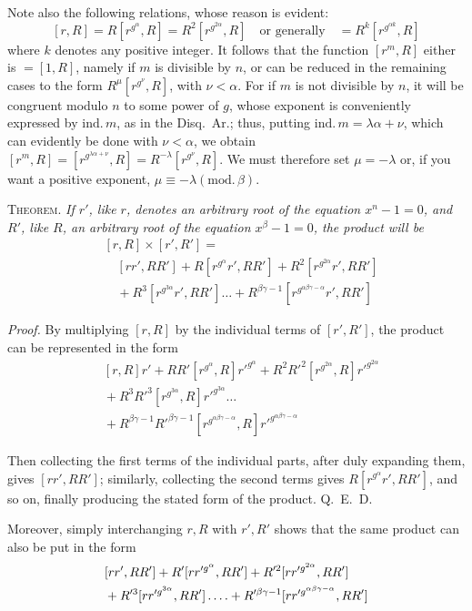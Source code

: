 Note also the following relations, whose reason is evident:
\[
[r,R]=R[r^{g^\alpha},R]=R^2[r^{g^{2\alpha}},R]\quad\text{or generally}\quad=R^k[r^{g^{\alpha k}},R]
\]
where $k$ denotes any positive integer. It follows that the function $[r^m,R]$ either is $=[1,R]$, namely if $m$ is divisible by $n$, or can be reduced in the remaining cases to the form $R^\mu[r^{g^\nu},R]$, with $\nu<\alpha$. For if $m$ is not divisible by $n$, it will be congruent modulo $n$ to some power of $g$, whose exponent is conveniently expressed by $\mathrm{ind.}\,m$, as in the Disq.\ Ar.; thus, putting $\mathrm{ind.}\,m=\lambda\alpha+\nu$, which can evidently be done with $\nu<\alpha$, we obtain $[r^m,R]=[r^{g^{\lambda\alpha+\nu}},R]=R^{-\lambda}[r^{g^\nu},R]$. We must therefore set $\mu=-\lambda$ or, if you want a positive exponent, $\mu\equiv-\lambda(\mathrm{mod.}\,\beta)$.

\textsc{Theorem.} \emph{If $r'$, like $r$, denotes an arbitrary root of the equation \mbox{$x^n-1=0$}, and $R'$, like $R$, an arbitrary root of the equation \mbox{$x^\beta-1=0$}, the product will be}
\[
\begin{aligned}
&[r,R]\times[r',R']=\\
&\quad[rr',RR']+R[r^{g^\alpha}r',RR']+R^2[r^{g^{2\alpha}}r',RR']\\
&\quad{}+R^3[r^{g^{3\alpha}}r',RR']\ldots+R^{\beta\gamma-1}[r^{g^{\alpha\beta\gamma-\alpha}}r',RR']
\end{aligned}
\]

\emph{Proof.} By multiplying $[r,R]$ by the individual terms of $[r',R']$, the product can be represented in the form
\[
\begin{aligned}
&[r,R]r'+RR'[r^{g^\alpha},R]r'^{g^\alpha}+R^2R'^2[r^{g^{2\alpha}},R]r'^{g^{2\alpha}}\\
&{}+R^3R'^3[r^{g^{3\alpha}},R]r'^{g^{3\alpha}}\ldots\\
&{}+R^{\beta\gamma-1}R'^{\beta\gamma-1}[r^{g^{\alpha\beta\gamma-\alpha}},R]r'^{g^{\alpha\beta\gamma-\alpha}}
\end{aligned}
\]

Then collecting the first terms of the individual parts, after duly expanding them, gives $[rr',RR']$; similarly, collecting the second terms gives $R[r^{g^\alpha}r',RR']$, and so on, finally producing the stated form of the product. Q.\ E.\ D.

Moreover, simply interchanging $r,R$ with $r',R'$ shows that the same product can also be put in the form
\[
\begin{aligned}
&[rr',RR']+R'[rr'^{g^\alpha},RR']+R'^2[rr'^{g^{2\alpha}},RR']\\
&{}+R'^3[rr'^{g^{3\alpha}},RR']\mathinner{.\,.\,.\,.}+R'^{\beta\gamma-1}[rr'^{g^{\alpha\beta\gamma-\alpha}},RR']
\end{aligned}
\]

